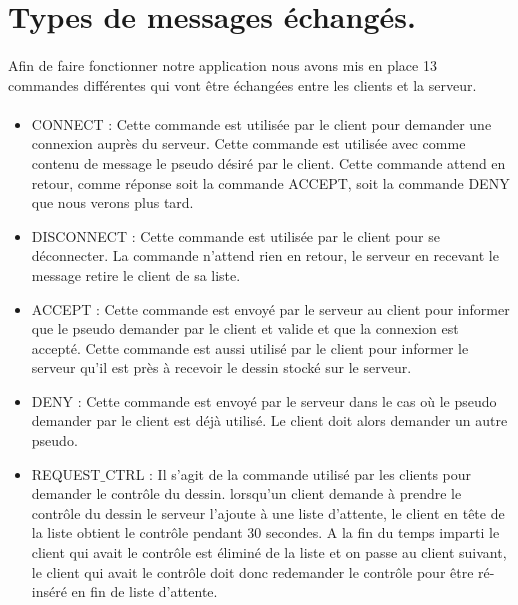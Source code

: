 \documentclass[a4paper,10pt]{article}
\begin{document}
\section{Types de messages échangés.}
\paragraph{}Afin de faire fonctionner notre application nous avons mis en place 13 commandes différentes qui vont être échangées entre les clients et la serveur.


\paragraph{}\begin{itemize}
\item CONNECT : Cette commande est utilisée par le client pour demander une connexion auprès du serveur. Cette commande est utilisée avec comme contenu de message le pseudo désiré par le client. Cette commande attend en retour, comme réponse soit la commande ACCEPT, soit la commande DENY que nous verons plus tard.

\item DISCONNECT : Cette commande est utilisée par le client pour se déconnecter. La commande n'attend rien en retour, le serveur en recevant le message retire le client de sa liste.

\item ACCEPT : Cette commande est envoyé par le serveur au client pour informer que le pseudo demander par le client et valide et que la connexion est accepté. Cette commande est aussi utilisé par le client pour informer le serveur qu'il est près à recevoir le dessin stocké sur le serveur.

\item DENY : Cette commande est envoyé par le serveur dans le cas où le pseudo demander par le client est déjà utilisé. Le client doit alors demander un autre pseudo.

\item  REQUEST$\_$CTRL : Il s'agit de la commande utilisé par les clients pour demander le contrôle du dessin.   lorsqu'un client demande à prendre le contrôle du dessin le serveur l'ajoute à une liste d'attente, le client en tête de la liste obtient le contrôle pendant 30 secondes. A la fin du temps imparti le client qui avait le contrôle est éliminé de la liste et on passe au client suivant, le client qui avait le contrôle doit donc redemander le contrôle pour être ré-inséré en fin de liste d'attente.


\end{itemize}
\end{document}
